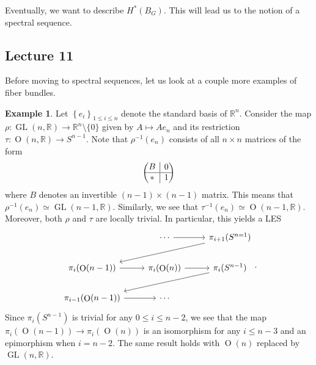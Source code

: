 \documentclass[10pt,letterpaper,cm]{nupset}
\theoremstyle{definition}
\newtheorem{exmp}[defn]{Example}
\theoremstyle{theorem}
\theoremstyle{remark}
\newcommand{\R}{\mathbb{R}}
\newcommand{\1}{\mathbb{1}}
\newcommand{\0}{\vec 0}
\DeclareMathOperator{\GL}{GL}
\DeclareMathOperator{\Or}{O}
\newcommand{\rvline}{\hspace*{-\arraycolsep}\vline\hspace*{-\arraycolsep}}
\begin{document}
Eventually, we want to describe $H^{\ast}\left(B_G\right)$. This will lead us to the notion of a spectral sequence. 

\subsection{Lecture 11}

Before moving to spectral sequences, let us look at a couple more examples of fiber bundles.

\begin{exmp}
Let $\left\{e_i\right\}_{1\leq i \leq n}$ denote the standard basis of $\R^n$.  Consider the map $\rho : \GL(n, \R) \to \R^n\setminus \{0\}$ given by $A \mapsto A{e_n}$ and its restriction $\tau : \Or(n, \R) \to S^{n-1}$.
Note that $\rho^{-1}(e_n)$ consists of all $n\times n$ matrices of the form 
\[
\begin{pmatrix}
  \begin{matrix}
 B
  \end{matrix}
  & \rvline & 0 \\
\hline
  \ast & \rvline &
  \begin{matrix}
 1
  \end{matrix}
\end{pmatrix}
\]
where $B$ denotes an invertible $\left(n-1\right) \times \left(n-1\right)$ matrix. This means that $\rho^{-1}(e_n) \simeq \GL(n-1, \R)$. Similarly, we see that $\tau^{-1}(e_n)\simeq \Or(n-1, \R)$. Moreover, both $\rho$ and $\tau$ are locally trivial. In particular, this yields a LES
\[
\begin{tikzcd}
                              & \cdots \arrow[r]        & \pi_{i+1}(S^{n=1}) \arrow[lld] \\
\pi_i(\Or(n-1)) \arrow[r]     & \pi_i(\Or(n)) \arrow[r] & \pi_i(S^{n-1}) \arrow[lld]     \\
\pi_{i-1}(\Or(n-1)) \arrow[r] & \cdots                  &                               
\end{tikzcd}.
\]
Since $\pi_i(S^{n-1})$ is trivial for any $0 \leq i \leq n-2$, we see that the map $\pi_i(\Or(n-1)) \to \pi_i(\Or(n))$ is an isomorphism for any $i\leq n-3$ and an epimorphism when $i=n-2$. The same result holds with $\Or(n)$ replaced by $\GL(n,\R)$.
\end{exmp}
\end{document}
